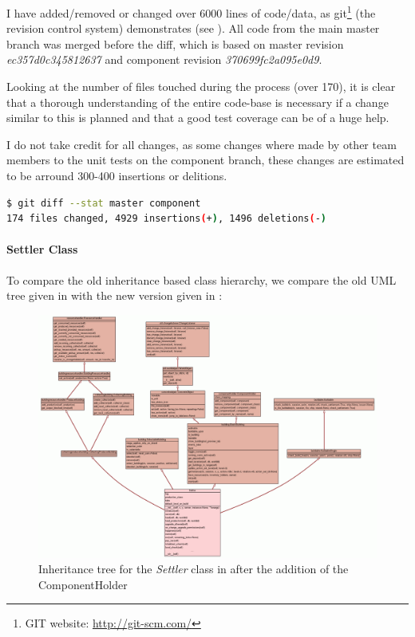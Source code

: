 I have added/removed or changed over 6000 lines of code/data, as git\footnote{GIT website:
\url{http://git-scm.com/}} (the revision control system) demonstrates (see ). 
All code from the main master branch was merged before the diff, which is based on master revision
\textit{ec357d0c345812637} and component revision \textit{370699fc2a095e0d9}.

Looking at the number of files touched during the process (over 170), it is clear that a thorough understanding of the entire
code-base is necessary if a change similar to this is planned and that a good test coverage can be of a huge help.

I do not take credit for all changes, as some changes where made by other team members to the unit tests on the
component branch, these changes are estimated to be arround 300-400 insertions or delitions.

\begin{lstlisting}[language=bash,caption=GIT diff between the current master branch and my component branch,
label=gitdiff]
$ git diff --stat master component
174 files changed, 4929 insertions(+), 1496 deletions(-)
\end{lstlisting}

\pagebreak

\paragraph{Settler Class}
To compare the old inheritance based class hierarchy, we compare the old UML tree given in  with
the new version given in :

\begin{figure}[!htb]
\includegraphics[angle=90,scale=0.35]{pics/settler_umlv}
\caption{Inheritance tree for the \textit{Settler} class in \UH{} after the addition of the ComponentHolder}
\label{fig:settleruml2}
\end{figure}

